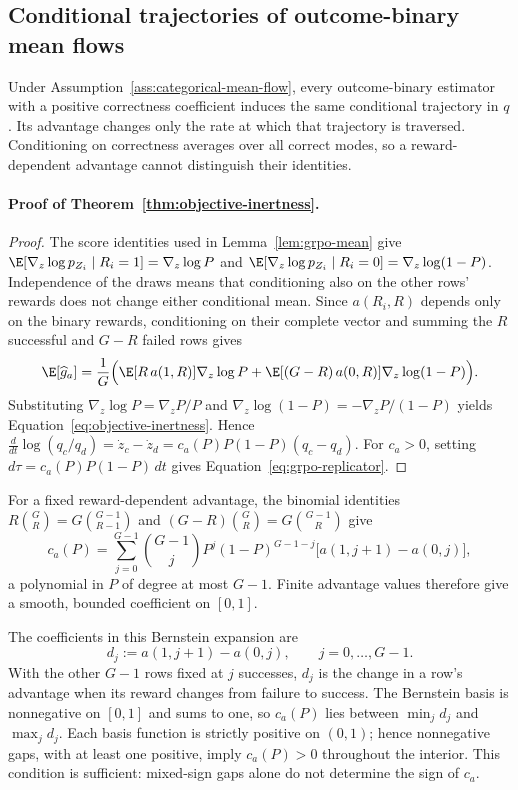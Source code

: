 \subsection{Conditional trajectories of outcome-binary mean flows}
\label{app:theory-objective-inertness}

Under Assumption~\ref{ass:categorical-mean-flow}, every outcome-binary
estimator with a positive correctness coefficient induces the same
conditional trajectory in $q$. Its advantage changes only the rate at which
that trajectory is traversed. Conditioning on correctness averages over all
correct modes, so a reward-dependent advantage cannot distinguish their
identities.

\paragraph{Proof of Theorem~\ref{thm:objective-inertness}.}

\begin{proof}
\enforcehalffinalproseline
The score identities used in Lemma~\ref{lem:grpo-mean} give
$\E[\nabla_z\log p_{Z_i}\mid R_i=1]=\nabla_z\log P$ and
$\E[\nabla_z\log p_{Z_i}\mid R_i=0]=\nabla_z\log(1-P)$.
Independence of the draws means that conditioning also on the other rows'
rewards does not change either conditional mean. Since $a(R_i,R)$ depends
only on the binary rewards, conditioning on their complete vector and
summing the $R$ successful and $G-R$ failed rows gives
\[
  \E[\widehat g_a]
  =\frac1G\Big(\E[R\,a(1,R)]\nabla_z\log P
   +\E[(G-R)\,a(0,R)]\nabla_z\log(1-P)\Big).
\]
Substituting $\nabla_z\log P=\nabla_zP/P$ and
$\nabla_z\log(1-P)=-\nabla_zP/(1-P)$ yields
Equation~\eqref{eq:objective-inertness}. Hence
$\frac{d}{dt}\log(q_c/q_d)=\dot z_c-\dot z_d=c_a(P)P(1-P)(q_c-q_d)$.
For $c_a>0$, setting $d\tau=c_a(P)P(1-P)\,dt$ gives
Equation~\eqref{eq:grpo-replicator}.
\end{proof}

For a fixed reward-dependent advantage, the binomial identities
$R\binom GR=G\binom{G-1}{R-1}$ and
$(G-R)\binom GR=G\binom{G-1}{R}$ give
\begin{equation}
 c_a(P)=\sum_{j=0}^{G-1}\binom{G-1}{j}P^j(1-P)^{G-1-j}
 \big[a(1,j+1)-a(0,j)\big],
 \label{eq:inertness-polynomial}
\end{equation}
a polynomial in $P$ of degree at most $G-1$. Finite advantage values
therefore give a smooth, bounded coefficient on $[0,1]$.

The coefficients in this Bernstein expansion are
\begin{equation}
 d_j:=a(1,j+1)-a(0,j),\qquad j=0,\ldots,G-1 .
 \label{eq:leave-one-out-gap}
\end{equation}
With the other $G-1$ rows fixed at $j$ successes, $d_j$ is the change in a
row's advantage when its reward changes from failure to success. The
Bernstein basis is nonnegative on $[0,1]$ and sums to one, so $c_a(P)$ lies
between $\min_jd_j$ and $\max_jd_j$. Each basis function is strictly positive
on $(0,1)$; hence nonnegative gaps, with at least one positive, imply
$c_a(P)>0$ throughout the interior. This condition is sufficient:
mixed-sign gaps alone do not determine the sign of $c_a$.

